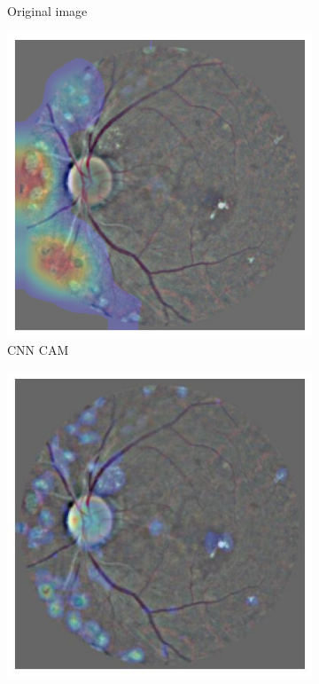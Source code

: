 \begin{figure}[tb]
\begin{subfigure}[b]{0.32\textwidth}
         \caption{Original image}
    \end{subfigure}
    \hfill
    \begin{subfigure}[b]{0.32\textwidth}
         \centering
         \includegraphics[width=\textwidth, height=\textwidth]{figures/chapter7/attention/28699_left_heatmap.png}
         \caption{CNN CAM}
     \end{subfigure}
    \hfill
    \begin{subfigure}[b]{0.32\textwidth}
         \centering
         \includegraphics[width=\textwidth, height=\textwidth]{figures/chapter7/attention/28699_left_attention.jpeg}

\end{subfigure}
\end{figure}

